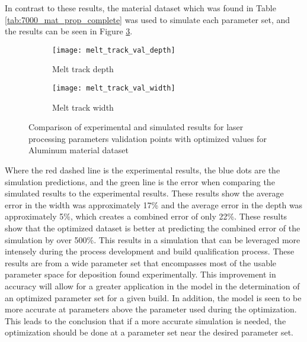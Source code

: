 In contrast to these results, the material dataset which was found in Table \ref{tab:7000_mat_prop_complete} was used to simulate each parameter set, and the results can be seen in Figure \ref{fig:melt_track_val}.
\begin{figure}[!htb]\centering
	\begin{subfigure}[c]{0.45\textwidth}\centering
	\texttt{[image: melt\_track\_val\_depth]}
	\caption{Melt track depth}
	\label{fig:melt_track_val_depth}
	\end{subfigure}\hfill{}
		\begin{subfigure}[c]{0.45\textwidth}\centering
		\texttt{[image: melt\_track\_val\_width]}
		\caption{Melt track width}
		\label{fig:melt_track_val_width}
		\end{subfigure}
	\caption{Comparison of experimental and simulated results for laser processing parameters validation points with optimized values for Aluminum material dataset}
	\label{fig:melt_track_val}
\end{figure}
Where the red dashed line is the experimental results, the blue dots are the simulation predictions, and the green line is the error when comparing the simulated results to the experimental results.
These results show the average error in the width was approximately 17\% and the average error in the depth was approximately 5\%, which creates a combined error of only 22\%.  These results show that the optimized dataset is better at predicting the combined error of the simulation by over 500\%.  This results in a simulation that can be leveraged more intensely during the process development and build qualification process.  
These results are from a wide parameter set that encompasses most of the usable parameter space for deposition found experimentally.  This improvement in accuracy will allow for a greater application in the model in the determination of an optimized parameter set for a given build.  In addition, the model is seen to be more accurate at parameters above the parameter used during the optimization.  This leads to the conclusion that if a more accurate simulation is needed, the optimization should be done at a parameter set near the desired parameter set.